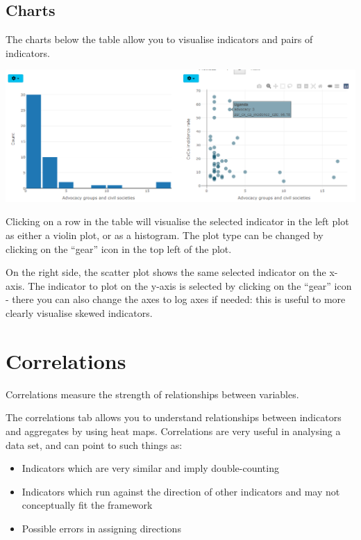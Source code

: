 \documentclass[
  letterpaper,
  DIV=11,
  numbers=noendperiod]{scrreprt}
\providecommand{\tightlist}{%
  \setlength{\itemsep}{0pt}\setlength{\parskip}{0pt}}\usepackage{longtable,booktabs,array}
\begin{document}
\hypertarget{charts}{%
\section{Charts}\label{charts}}

The charts below the table allow you to visualise indicators and pairs
of indicators.

\includegraphics[width=1\textwidth,height=\textheight]{figs/stats_2.png}

Clicking on a row in the table will visualise the selected indicator in
the left plot as either a violin plot, or as a histogram. The plot type
can be changed by clicking on the ``gear'' icon in the top left of the
plot.

On the right side, the scatter plot shows the same selected indicator on
the x-axis. The indicator to plot on the y-axis is selected by clicking
on the ``gear'' icon - there you can also change the axes to log axes if
needed: this is useful to more clearly visualise skewed indicators.

\hypertarget{sec-correlations}{%
\chapter{Correlations}\label{sec-correlations}}

Correlations measure the strength of relationships between variables.

The correlations tab allows you to understand relationships between
indicators and aggregates by using heat maps. Correlations are very
useful in analysing a data set, and can point to such things as:

\begin{itemize}
\tightlist
\item
  Indicators which are very similar and imply double-counting
\item
  Indicators which run against the direction of other indicators and may
  not conceptually fit the framework
\item
  Possible errors in assigning directions
\end{itemize}
\end{document}
